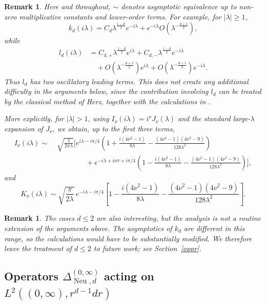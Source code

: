 \documentclass[12pt]{amsart}
\newcommand\Neu{\operatorname{Neu}}
\newcommand\LapoN{\Delta^{(0, \infty)}_{\Neu, d}}
\newtheorem{remark}[theorem]{Remark}
\begin{document}
\begin{remark}\label{remark1}
Here and throughout, \(\sim\) denotes asymptotic equivalence up to non-zero
multiplicative constants and lower-order terms. For example, for
\(|\lambda|\geq 1\),
\[
k_d(i\lambda)
=
C_d\lambda^{\frac{1-d}{2}}e^{-i\lambda}
+
e^{-i\lambda}O\!\left(\lambda^{-\frac{d+1}{2}}\right),
\]
while
\[
\begin{aligned}
l_d(i\lambda)
&=
C_{d,+}\lambda^{\frac{1-d}{2}}e^{i\lambda}
+
C_{d,-}\lambda^{\frac{1-d}{2}}e^{-i\lambda}  \\
&\quad
+
O\!\left(\lambda^{-\frac{d+1}{2}}\right)e^{i\lambda}
+
O\!\left(\lambda^{-\frac{d+1}{2}}\right)e^{-i\lambda}.
\end{aligned}
\]
Thus \(l_d\) has two oscillatory leading terms. This does not create any
additional difficulty in the arguments below, since the contribution involving
\(l_d\) can be treated by the classical method of Herz, together with the
calculations in \cite{COSY}.

More explicitly, for \(|\lambda|>1\), using
\(I_\nu(i\lambda)=i^\nu J_\nu(\lambda)\) and the standard large-\(\lambda\)
expansion of \(J_\nu\), we obtain, up to the first three terms,
\[
\begin{aligned}
I_\nu(i\lambda)
\sim\;&
\sqrt{\frac{1}{2\pi\lambda}}
\Bigg[
e^{i\lambda-i\pi/4}
\left(
1+\frac{i(4\nu^2-1)}{8\lambda}
-\frac{(4\nu^2-1)(4\nu^2-9)}{128\lambda^2}
\right)
\\
&\qquad\qquad
+
e^{-i\lambda+i\nu\pi+i\pi/4}
\left(
1-\frac{i(4\nu^2-1)}{8\lambda}
-\frac{(4\nu^2-1)(4\nu^2-9)}{128\lambda^2}
\right)
\Bigg],
\end{aligned}
\]
and
\[
K_\nu(i\lambda)
\sim
\sqrt{\frac{\pi}{2\lambda}}\,e^{-i\lambda-i\pi/4}
\left[
1-\frac{i(4\nu^2-1)}{8\lambda}
-\frac{(4\nu^2-1)(4\nu^2-9)}{128\lambda^2}
\right].
\]
\end{remark}

\begin{remark} The cases \(d\leq 2\) are also interesting, but the analysis is not a routine extension of the arguments above. The asymptotics of \(k_d\) are different in this range, so the calculations would have to be substantially modified. We therefore leave the treatment of \(d\leq 2\) to future work; see Section~\ref{oppr}. \end{remark}


\subsection{Operators \texorpdfstring{$\LapoN$}{LapoN} acting on
\texorpdfstring{$L^2((0,\infty), r^{d-1}dr)$}{L2}}
\end{document}
